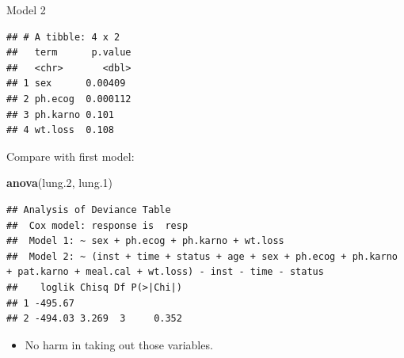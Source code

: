 \documentclass[ignorenonframetext,]{beamer}
\newenvironment{Shaded}{\begin{snugshade}}{\end{snugshade}}
\newcommand{\FloatTok}[1]{\textcolor[rgb]{0.00,0.00,0.81}{#1}}
\newcommand{\KeywordTok}[1]{\textcolor[rgb]{0.13,0.29,0.53}{\textbf{#1}}}
\newcommand{\NormalTok}[1]{#1}
\newcommand{\OperatorTok}[1]{\textcolor[rgb]{0.81,0.36,0.00}{\textbf{#1}}}
\newcommand{\StringTok}[1]{\textcolor[rgb]{0.31,0.60,0.02}{#1}}
\providecommand{\tightlist}{%
  \setlength{\itemsep}{0pt}\setlength{\parskip}{0pt}}
\begin{document}
\begin{frame}[fragile]{Model 2}
\protect\hypertarget{model-2}{}

\normalsize

\begin{Shaded}
\end{Shaded}

\begin{verbatim}
## # A tibble: 4 x 2
##   term      p.value
##   <chr>       <dbl>
## 1 sex      0.00409 
## 2 ph.ecog  0.000112
## 3 ph.karno 0.101   
## 4 wt.loss  0.108
\end{verbatim}

\normalsize

\end{frame}

\begin{frame}[fragile]{Compare with first model:}
\protect\hypertarget{compare-with-first-model}{}

\normalsize

\begin{Shaded}
\begin{Highlighting}[]
\KeywordTok{anova}\NormalTok{(lung}\FloatTok{.2}\NormalTok{, lung}\FloatTok{.1}\NormalTok{)}
\end{Highlighting}
\end{Shaded}

\begin{verbatim}
## Analysis of Deviance Table
##  Cox model: response is  resp
##  Model 1: ~ sex + ph.ecog + ph.karno + wt.loss
##  Model 2: ~ (inst + time + status + age + sex + ph.ecog + ph.karno + pat.karno + meal.cal + wt.loss) - inst - time - status
##    loglik Chisq Df P(>|Chi|)
## 1 -495.67                   
## 2 -494.03 3.269  3     0.352
\end{verbatim}

\normalsize

\begin{itemize}
\tightlist
\item
  No harm in taking out those variables.
\end{itemize}

\end{frame}
\end{document}
